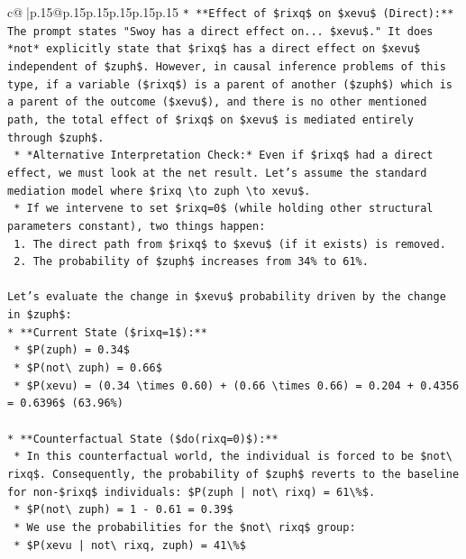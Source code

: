 \documentclass{article}
\begin{document}
{\begin{supertabular}{c@{$\;$}|p{.15\linewidth}@{}p{.15\linewidth}p{.15\linewidth}p{.15\linewidth}p{.15\linewidth}p{.15\linewidth}}
{{{\texttt{*   **Effect of \$rixq\$ on \$xevu\$ (Direct):** The prompt states "Swoy has a direct effect on... \$xevu\$." It does *not* explicitly state that \$rixq\$ has a direct effect on \$xevu\$ independent of \$zuph\$. However, in causal inference problems of this type, if a variable (\$rixq\$) is a parent of another (\$zuph\$) which is a parent of the outcome (\$xevu\$), and there is no other mentioned path, the total effect of \$rixq\$ on \$xevu\$ is mediated entirely through \$zuph\$.} \\
\texttt{    *   *Alternative Interpretation Check:* Even if \$rixq\$ had a direct effect, we must look at the net result. Let's assume the standard mediation model where \$rixq \textbackslash{}to zuph \textbackslash{}to xevu\$.} \\
\texttt{    *   If we intervene to set \$rixq=0\$ (while holding other structural parameters constant), two things happen:} \\
\texttt{        1.  The direct path from \$rixq\$ to \$xevu\$ (if it exists) is removed.} \\
\texttt{        2.  The probability of \$zuph\$ increases from 34\% to 61\%.} \\
\\ 
\texttt{Let's evaluate the change in \$xevu\$ probability driven by the change in \$zuph\$:} \\
\texttt{*   **Current State (\$rixq=1\$):**} \\
\texttt{    *   \$P(zuph) = 0.34\$} \\
\texttt{    *   \$P(not\textbackslash{} zuph) = 0.66\$} \\
\texttt{    *   \$P(xevu) = (0.34 \textbackslash{}times 0.60) + (0.66 \textbackslash{}times 0.66) = 0.204 + 0.4356 = 0.6396\$ (63.96\%)} \\
\\ 
\texttt{*   **Counterfactual State (\$do(rixq=0)\$):**} \\
\texttt{    *   In this counterfactual world, the individual is forced to be \$not\textbackslash{} rixq\$. Consequently, the probability of \$zuph\$ reverts to the baseline for non{-}\$rixq\$ individuals: \$P(zuph | not\textbackslash{} rixq) = 61\textbackslash{}\%\$.} \\
\texttt{    *   \$P(not\textbackslash{} zuph) = 1 {-} 0.61 = 0.39\$} \\
\texttt{    *   We use the probabilities for the \$not\textbackslash{} rixq\$ group:} \\
\texttt{        *   \$P(xevu | not\textbackslash{} rixq, zuph) = 41\textbackslash{}\%\$} \\
}}}
\end{supertabular}}
\end{document}
